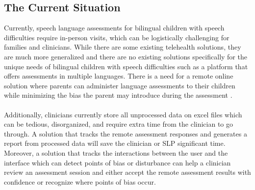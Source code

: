 \documentclass[12pt]{article}
\begin{document}
\subsection{The Current Situation}
\hspace{2em}Currently, speech language assessments for bilingual children with speech difficulties require in-person visits, which can be logistically challenging 
for families and clinicians. While there are some existing telehealth solutions, they are much more generalized and there are no existing solutions 
specifically for the unique needs of bilingual children with speech difficulties such as a platform that offers assessments in multiple languages. 
There is a need for a remote online solution where parents can administer language assessments to their children while minimizing the bias the parent 
may introduce during the assessment \cite{speech_therapy}. \\\\
\indent Additionally, clinicians currently store all unprocessed data on excel files which can be tedious, disorganized, and require extra time from the clinician 
to go through. A solution that tracks the remote assessment responses and generates a report from processed data will save the clinician or SLP significant 
time. Moreover, a solution that tracks the interactions between the user and the interface which can detect points of bias or disturbance can help a clinician 
review an assessment session and either accept the remote assessment results with confidence or recognize where points of bias occur.

\newpage
\end{document}
